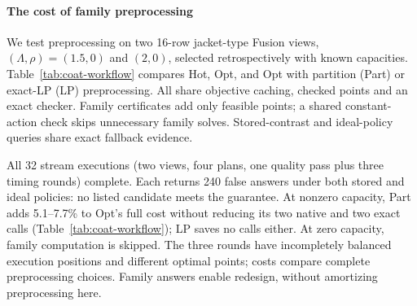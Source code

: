 \paragraph{The cost of family preprocessing}
We test preprocessing on two 16-row jacket-type Fusion views,
$(\Lambda,\rho)=(1.5,0)$ and $(2,0)$, selected retrospectively with known capacities.
Table~\ref{tab:coat-workflow} compares Hot, Opt, and Opt with partition
(Part) or exact-LP (LP) preprocessing. All share objective caching, checked
points and an exact checker. Family certificates add only feasible points;
a shared constant-action check skips unnecessary family solves.
Stored-contrast and ideal-policy queries share exact fallback evidence.

\begin{table}[t]
\centering
\caption{Preprocessing the unchanged 240-query Coat catalogue.}
\label{tab:coat-workflow}

\end{table}

All 32 stream executions (two views, four plans, one quality pass plus three timing rounds) complete. Each returns 240 false answers under both stored and ideal policies: no listed candidate meets the guarantee.
At nonzero capacity, Part adds 5.1--7.7\% to Opt's full cost without reducing
its two native and two exact calls (Table~\ref{tab:coat-workflow});
LP saves no calls either. At zero capacity, family computation is skipped.
The three rounds have incompletely balanced execution positions and different optimal points; costs compare complete preprocessing choices.
Family answers enable redesign, without amortizing preprocessing here.
